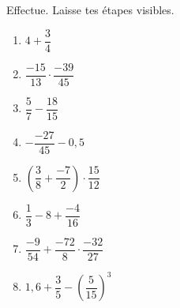%
%
    Effectue. Laisse tes étapes visibles.
    \begin{enumerate}[cols=2]
        \item $4+\dfrac{3}{4}$
        \item $\dfrac{-15}{13} \cdot \dfrac{-39}{45}$
        \item $\dfrac{5}{7} - \dfrac{18}{15}$
        \item $-\dfrac{-27}{45} - 0,5$
        \item $\left(\dfrac{3}{8} + \dfrac{-7}{2}\right)\cdot \dfrac{15}{12}$
        \item $\dfrac{1}{3}-8+\dfrac{-4}{16}$
        \item $\dfrac{-9}{54} + \dfrac{-72}{8} \cdot \dfrac{-32}{27}$
        \item $1,6 + \dfrac{3}{5} - \left(\dfrac{5}{15}\right)^3$
    \end{enumerate}
